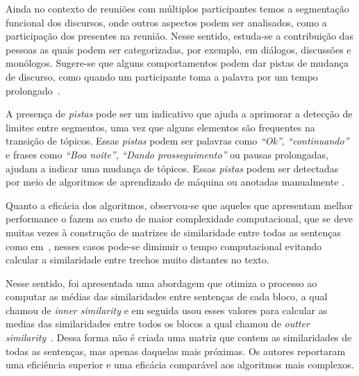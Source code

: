 Ainda no contexto de reuniões com múltiplos participantes temos a segmentação funcional dos discursos, onde outros aspectos podem ser analisados, como a participação dos presentes na reunião. Nesse sentido, estuda-se a contribuição das pessoas as quais podem ser categorizadas,  por exemplo, em diálogos, discussões e monólogos. Sugere-se que alguns comportamentos podem dar pistas de mudança de discurso, como quando um participante toma a palavra por um tempo prolongado~\cite{Bokaei2015}. 



A presença de \textit{pistas} pode ser um indicativo que ajuda a aprimorar a detecção de limites entre segmentos, uma vez que alguns elementos são frequentes na transição de tópicos. 
%
Essas \textit{pistas} podem ser palavras como \textit{``Ok''}, \textit{``continuando''} e frases como \textit{``Boa noite''}, \textit{``Dando prosseguimento''} ou pausas prolongadas, ajudam a indicar uma mudança de tópicos. 
%
Essas \textit{pistas} podem ser detectadas por meio de algoritmos de aprendizado de máquina ou anotadas manualmente
\cite{Hsueh2006} %
\cite{Galley2003} 
\cite{Beeferman1999}.



Quanto a eficácia dos algoritmos, observou-se que aqueles que apresentam melhor performance o fazem ao custo de maior complexidade computacional, que se deve muitas vezes à construção de matrizes de similaridade entre todas as sentenças como em~\cite{Choi2000}, nesses casos pode-se diminuir o tempo computacional evitando calcular a similaridade entre trechos muito distantes no texto.

Nesse sentido, foi apresentada uma abordagem que otimiza o processo ao computar as médias das similaridades entre sentenças de cada bloco, a qual chamou de \textit{inner similarity} e em seguida usou esses valores para calcular as medias das similaridades entre todos os blocos a qual chamou de \textit{outter similarity}~\cite{Kern2009}. Dessa forma não é criada uma matriz que contem as similaridades de todas as sentenças, mas apenas daquelas mais próximas. Os autores reportaram uma eficiência superior e uma eficácia comparável aos algoritmos mais complexos.


